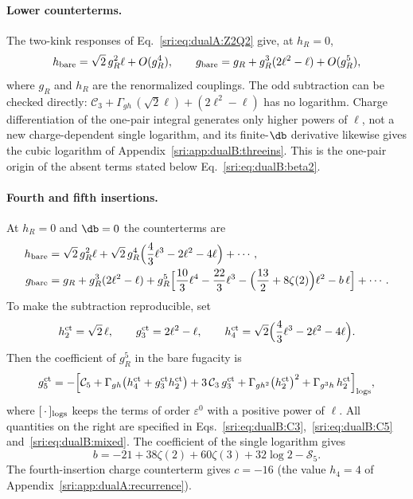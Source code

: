 \paragraph{Lower counterterms.} The two-kink responses of Eq.~\eqref{sri:eq:dualA:Z2Q2} give, at $h_R=0$,
\begin{equation}
 h_{\rm bare}=\sqrt2\,g_R^2\ell+O(g_R^4),\qquad g_{\rm bare}=g_R+g_R^3(2\ell^2-\ell)+O(g_R^5),
 \label{sri:eq:dualB:lowerct}
\end{equation}
where $g_R$ and $h_R$ are the renormalized couplings. The odd subtraction can be checked directly:
$\mathcal C_3+\Gamma_{gh}\,(\sqrt2\ell)+(2\ell^2-\ell)$ has no logarithm. Charge differentiation of the one-pair
integral generates only higher powers of $\ell$, not a new charge-dependent single logarithm, and its finite-$\db$
derivative likewise gives the cubic logarithm of Appendix~\ref{sri:app:dualB:threeins}. This is the one-pair origin of the
absent terms stated below Eq.~\eqref{sri:eq:dualB:beta2}.

\paragraph{Fourth and fifth insertions.} At $h_R=0$ and $\db=0$ the counterterms are
\begin{equation}
\begin{aligned}
 h_{\rm bare}={}&\sqrt2\,g_R^2\ell+\sqrt2\,g_R^4\Bigl(\frac43\ell^3-2\ell^2-4\ell\Bigr)+\cdots,\\
 g_{\rm bare}={}&g_R+g_R^3(2\ell^2-\ell)
 +g_R^5\Bigl[\frac{10}{3}\ell^4-\frac{22}{3}\ell^3-\Bigl(\frac{13}{2}+8\zeta(2)\Bigr)\ell^2-b\,\ell\Bigr]+\cdots.
\end{aligned}
\label{sri:eq:dualB:g5ct}
\end{equation}
To make the subtraction reproducible, set
\begin{equation}
 h^{\rm ct}_2=\sqrt2\,\ell,\qquad g^{\rm ct}_3=2\ell^2-\ell,\qquad
 h^{\rm ct}_4=\sqrt2\Bigl(\frac43\ell^3-2\ell^2-4\ell\Bigr).
\end{equation}
Then the coefficient of $g_R^5$ in the bare fugacity is
\begin{equation}
 g^{\rm ct}_5=-\Bigl[\mathcal C_5+\Gamma_{gh}\bigl(h^{\rm ct}_4+g^{\rm ct}_3h^{\rm ct}_2\bigr)+3\,\mathcal C_3\,g^{\rm ct}_3
 +\Gamma_{gh^2}\bigl(h^{\rm ct}_2\bigr)^2+\Gamma_{g^3h}\,h^{\rm ct}_2\Bigr]_{\rm logs},
 \label{sri:eq:dualB:g5assembly}
\end{equation}
where $[\,\cdot\,]_{\rm logs}$ keeps the terms of order $\varepsilon^0$ with a positive power of $\ell$. All quantities
on the right are specified in Eqs.~\eqref{sri:eq:dualB:C3},~\eqref{sri:eq:dualB:C5} and~\eqref{sri:eq:dualB:mixed}. The
coefficient of the single logarithm gives
\begin{equation}
 b=-21+38\zeta(2)+60\zeta(3)+32\log2-\mathcal S_5.
 \label{sri:eq:dualB:bperiod}
\end{equation}
The fourth-insertion charge counterterm gives $c=-16$ (the value $h_4=4$ of Appendix~\ref{sri:app:dualA:recurrence}).

